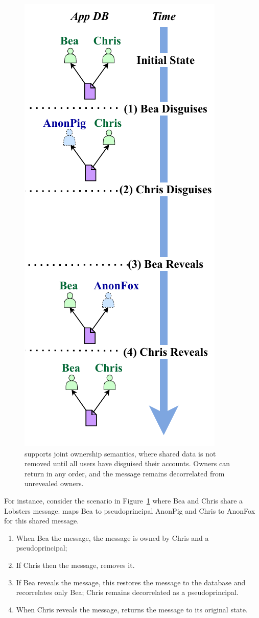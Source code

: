 \begin{figure}
    \centering
    \includegraphics[width=.4\textwidth]{figs/shared_hl}
    \caption[\sys supports joint ownership semantics when disguising shared data.]{\sys supports joint ownership semantics, where shared data is not
    removed until all users have disguised their accounts. Owners can return in
    any order, and the message remains decorrelated from unrevealed owners.}
\label{f:shared:hl}
\end{figure}

%
For instance, consider the scenario in Figure~\ref{f:shared:hl} where Bea and
Chris share a Lobsters message. \sys maps Bea to pseudoprincipal AnonPig and Chris to AnonFox for this shared message.
\begin{enumerate}[nosep]
    \item[(1)] When Bea \xxs the message, the message is owned by
Chris and a pseudoprincipal;
    \item[(2)] If Chris then \xxs the message, \sys removes it.
    \item[(3)] If Bea reveals the message, this restores the message to the database
and recorrelates only Bea; Chris remains decorrelated as a pseudoprincipal.
\item[(4)] When Chris reveals the message, \sys returns
the message to its original state.
\end{enumerate}
%

